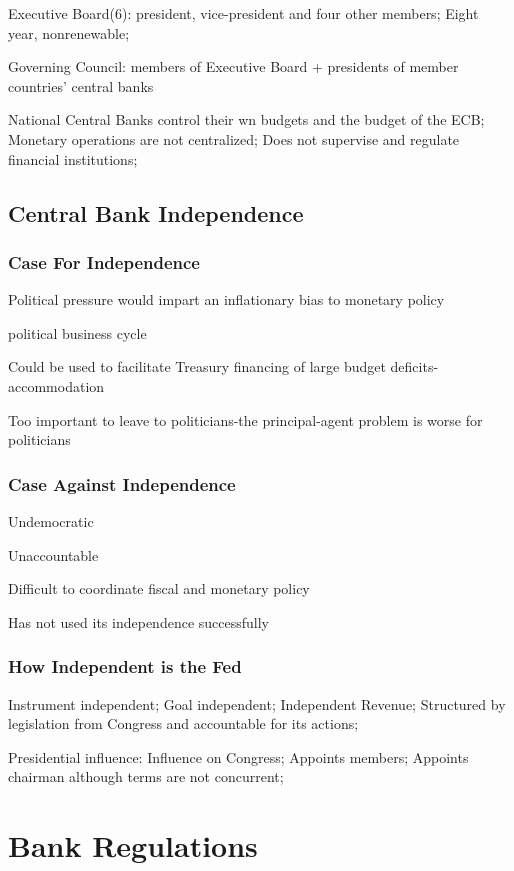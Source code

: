 \documentclass[10pt, a4paper]{article}
\begin{document}
        Executive Board(6): president, vice-president and four other members; Eight year, nonrenewable; 

        Governing Council: members of Executive Board + presidents of member countries' central banks 

        National Central Banks control their wn budgets  and the budget of the ECB; Monetary operations are not centralized; Does not supervise and regulate financial institutions;  

    \subsection{Central Bank Independence}
        \subsubsection{Case For Independence}
        Political pressure would impart an inflationary bias to monetary policy 

        political business cycle 

        Could be used to facilitate Treasury financing of large budget deficits-accommodation 

        Too important to leave to politicians-the principal-agent problem is worse for politicians 

        \subsubsection{Case Against Independence}
        
        Undemocratic

        Unaccountable 

        Difficult to coordinate fiscal and monetary policy 

        Has not  used its independence successfully 

        \subsubsection{How Independent is the Fed}

        Instrument independent; Goal independent; Independent Revenue; Structured by legislation from Congress and accountable for its actions; 

        Presidential influence: Influence on Congress; Appoints members; Appoints chairman although terms are not concurrent; 

\section{Bank Regulations}
\end{document}
